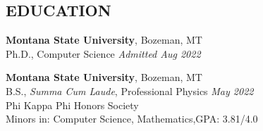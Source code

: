 \documentclass[margin]{res}
\begin{document}
\begin{resume}

\section{EDUCATION}
\raggedright
\textbf{Montana State University}, Bozeman, MT\\\vspace{0.5ex}
Ph.D., Computer Science \hfill %
\hfill {\sl Admitted Aug 2022}

\textbf{Montana State University}, Bozeman, MT\\\vspace{0.5ex}
B.S., {\sl Summa Cum Laude}, Professional Physics \hfill {\sl May 2022}\\
Phi Kappa Phi Honors Society\\
Minors in: Computer Science, Mathematics,\hfill GPA: 3.81/4.0


%


\end{resume}
\end{document}
